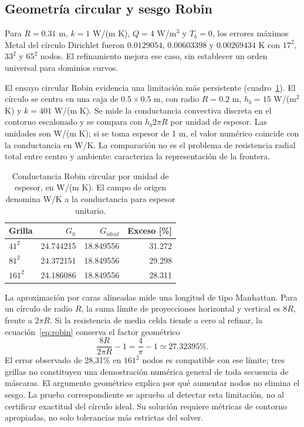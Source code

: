 \documentclass[11pt,a4paper]{article}
\begin{document}
\subsection{Geometría circular y sesgo Robin}
Para $R=0.31$ m, $k=1$ W/(m K), $Q=4$ W/m$^3$ y $T_b=0$, los errores máximos Metal del círculo Dirichlet fueron $0.0129054$, $0.00603398$ y $0.00269434$ K con $17^2$, $33^2$ y $65^2$ nodos. El refinamiento mejora ese caso, sin establecer un orden universal para dominios curvos.

El ensayo circular Robin evidencia una limitación más persistente (cuadro~\ref{tab:robin}). El círculo se centra en una caja de $0.5\times0.5$ m, con radio $R=0.2$ m, $h_b=15$ W/(m$^2$ K) y $k=401$ W/(m K). Se mide la conductancia convectiva discreta en el contorno escalonado y se compara con $h_b2\pi R$ por unidad de espesor. Las unidades son W/(m K); si se toma espesor de 1 m, el valor numérico coincide con la conductancia en W/K. La comparación no es el problema de resistencia radial total entre centro y ambiente: caracteriza la representación de la frontera.

\begin{table}[tbp]\centering\small
\caption{Conductancia Robin circular por unidad de espesor, en W/(m K). El campo de origen denomina W/K a la conductancia para espesor unitario.}\label{tab:robin}
\begin{tabular}{@{}lrrr@{}}\toprule
Grilla & $G_h$ & $G_{ideal}$ & Exceso [\%]\\\midrule
$41^2$ & 24.744215 & 18.849556 & 31.272\\
$81^2$ & 24.372151 & 18.849556 & 29.298\\
$161^2$ & 24.186086 & 18.849556 & 28.311\\
\bottomrule\end{tabular}\end{table}

La aproximación por caras alineadas mide una longitud de tipo Manhattan. Para un círculo de radio $R$, la suma límite de proyecciones horizontal y vertical es $8R$, frente a $2\pi R$. Si la resistencia de media celda tiende a cero al refinar, la ecuación~\eqref{eq:robin} conserva el factor geométrico
\begin{equation}
 \frac{8R}{2\pi R}-1=\frac4\pi-1\simeq27.32395\%.
 \label{eq:bias}
\end{equation}
El error observado de 28,31\% en $161^2$ nodos es compatible con ese límite; tres grillas no constituyen una demostración numérica general de toda secuencia de máscaras. El argumento geométrico explica por qué aumentar nodos no elimina el sesgo. La prueba correspondiente se aprueba al detectar esta limitación, no al certificar exactitud del círculo ideal. Su solución requiere métricas de contorno apropiadas, no solo tolerancias más estrictas del solver.
\end{document}
